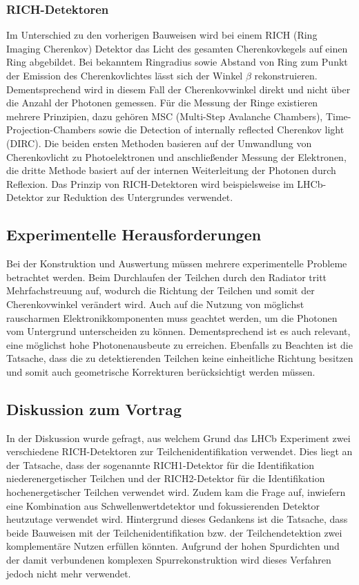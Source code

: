 \subsubsection{RICH-Detektoren}
Im Unterschied zu den vorherigen Bauweisen wird bei einem RICH (Ring Imaging Cherenkov) Detektor das Licht des gesamten Cherenkovkegels auf einen Ring abgebildet.
Bei bekanntem Ringradius sowie Abstand von Ring zum Punkt der Emission des Cherenkovlichtes lässt sich der Winkel $\beta$ rekonstruieren.
Dementsprechend wird in diesem Fall der Cherenkovwinkel direkt und nicht über die Anzahl der Photonen gemessen.
Für die Messung der Ringe existieren mehrere Prinzipien, dazu gehören MSC (Multi-Step Avalanche Chambers), Time-Projection-Chambers sowie die Detection of internally reflected Cherenkov light (DIRC).
Die beiden ersten Methoden basieren auf der Umwandlung von Cherenkovlicht zu Photoelektronen und anschließender Messung der Elektronen, die dritte Methode basiert auf der internen Weiterleitung der Photonen durch Reflexion.
Das Prinzip von RICH-Detektoren wird beispielsweise im LHCb-Detektor zur Reduktion des Untergrundes verwendet.

\subsection{Experimentelle Herausforderungen}
Bei der Konstruktion und Auswertung müssen mehrere experimentelle Probleme betrachtet werden.
Beim Durchlaufen der Teilchen durch den Radiator tritt Mehrfachstreuung auf, wodurch die Richtung der Teilchen und somit der Cherenkovwinkel verändert wird.
Auch auf die Nutzung von möglichst rauscharmen Elektronikkomponenten muss geachtet werden, um die Photonen vom Untergrund unterscheiden zu können.
Dementsprechend ist es auch relevant, eine möglichst hohe Photonenausbeute zu erreichen. 
Ebenfalls zu Beachten ist die Tatsache, dass die zu detektierenden Teilchen keine einheitliche Richtung besitzen und somit auch geometrische Korrekturen berücksichtigt werden müssen. 

\subsection{Diskussion zum Vortrag}
In der Diskussion wurde gefragt, aus welchem Grund das LHCb Experiment zwei verschiedene RICH-Detektoren zur Teilchenidentifikation verwendet.
Dies liegt an der Tatsache, dass der sogenannte RICH1-Detektor für die Identifikation niederenergetischer Teilchen und der RICH2-Detektor für die Identifikation hochenergetischer Teilchen verwendet wird.
Zudem kam die Frage auf, inwiefern eine Kombination aus Schwellenwertdetektor und fokussierenden Detektor heutzutage verwendet wird.
Hintergrund dieses Gedankens ist die Tatsache, dass beide Bauweisen mit der Teilchenidentifikation bzw. der Teilchendetektion zwei komplementäre Nutzen erfüllen könnten.
Aufgrund der hohen Spurdichten und der damit verbundenen komplexen Spurrekonstruktion wird dieses Verfahren jedoch nicht mehr verwendet.